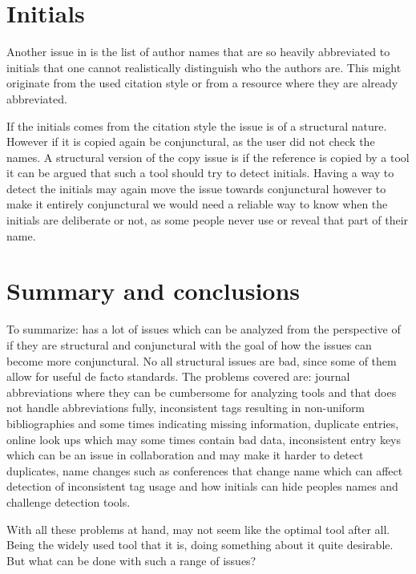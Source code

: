 \section{Initials}
\label{sec:problems_initials}

Another issue in  is the list of author
names that are so heavily abbreviated to initials that one cannot
realistically distinguish who the authors are.  This might originate
from the used citation style or from a resource where they are already
abbreviated.

If the initials comes from the citation style the issue is of a
structural nature.  However if it is copied again be conjunctural, as
the user did not check the names.  A structural version of the copy
issue is if the reference is copied by a tool it can be argued that
such a tool should try to detect initials.  Having a way to detect the
initials may again move the issue towards conjunctural however to make
it entirely conjunctural we would need a reliable way to know when the
initials are deliberate or not, as some people never use or reveal
that part of their name.


\section{Summary and conclusions}
\label{sec:problems_conclusion}

To summarize: {\bibtex} has a lot of issues which can be analyzed from
the perspective of if they are structural and conjunctural with the
goal of how the issues can become more conjunctural.  No all
structural issues are bad, since some of them allow for useful de
facto standards.  The problems covered are: journal abbreviations
where they can be cumbersome for analyzing tools and that {\bibtex}
does not handle abbreviations fully, inconsistent tags resulting in
non-uniform bibliographies and some times indicating missing
information, duplicate entries, online look ups which may some times
contain bad data, inconsistent entry keys which can be an issue in
collaboration and may make it harder to detect duplicates, name
changes such as conferences that change name which can affect
detection of inconsistent tag usage and how initials can hide peoples
names and challenge detection tools.

With all these problems at hand, {\bibtex} may not seem like the
optimal tool after all.  Being the widely used tool that it is, doing
something about it quite desirable.  But what can be done with such a
range of issues?
